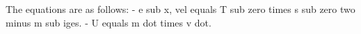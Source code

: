 The equations are as follows:
- e sub x, vel equals T sub zero times s sub zero two minus m sub iges.
- U equals m dot times v dot.